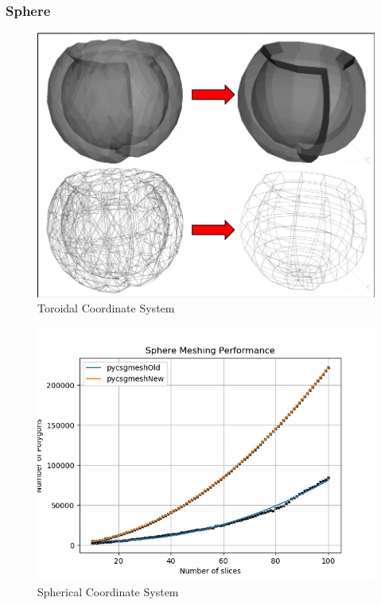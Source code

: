 \documentclass[12pt,a4paper]{article}
\begin{document}
\newpage
\subsubsection{Sphere}

\begin{figure}[h!]
\centering
\includegraphics[scale=0.5]{Images//Meshes//sphere.png}
\caption[width=\columnwidth]{Toroidal Coordinate System}
\label{conts}
\end{figure}

\begin{figure}[h!]
\centering
\includegraphics[scale=0.5]{Images//Quad_fits//Sphere_quad.png}
\caption[width=\columnwidth]{Spherical Coordinate System}
\label{conts}
\end{figure}
\end{document}
